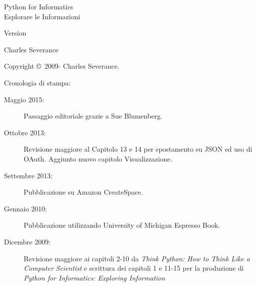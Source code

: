 



\newtheorem{ex}{Exercise}[chapter]

\begin{latexonly}

\renewcommand{\blankpage}{\thispagestyle{empty} \quad \newpage}

\thispagestyle{empty}

\begin{flushright}
\vspace*{2.0in}

\begin{spacing}{3}
{\huge Python for Informatics}\\
{\Large Esplorare le Informazioni}
\end{spacing}

\vspace{0.25in}

Version \theversion

\vspace{0.5in}


{\Large
Charles Severance\\
}

\vfill

\end{flushright}

\pagebreak
\thispagestyle{empty}

{\small
Copyright \copyright ~2009- Charles Severance.


Cronologia di stampa:

\begin{description}

\item[Maggio 2015:] Passaggio editoriale grazie a Sue Blumenberg.

\item[Ottobre 2013:] Revisione maggiore al Capitolo 13 e 14 per spostamento su JSON ed uso di  OAuth. Aggiunto nuovo capitolo Visualizzazione.

\item[Settembre 2013:] Pubblicazione su Amazon CreateSpace.

\item[Gennaio 2010:]  Pubblicazione utilizzando University of Michigan Espresso Book.

\item[Dicembre 2009:] Revisione maggiore ai capitoli 2-10 da 
\emph{Think Python: How to Think Like
a Computer Scientist}
e scrittura dei capitoli 1 e 11-15 per la produzione di 
\emph{Python for Informatics: Exploring Information}


\end{description}}
\end{latexonly}
